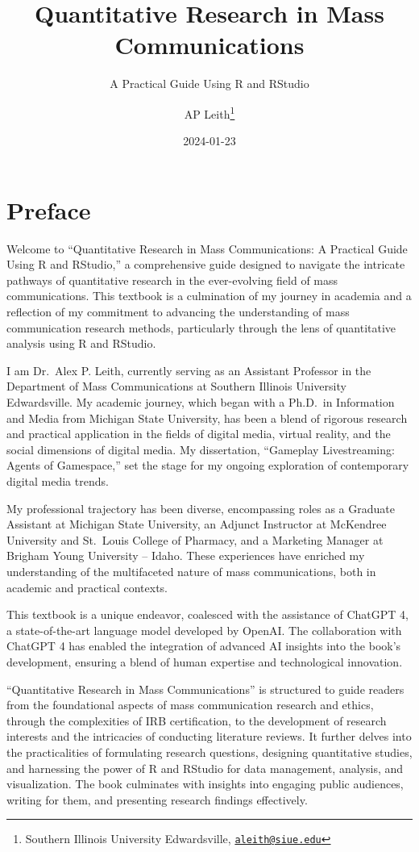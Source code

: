 \documentclass[
]{book}
\title{Quantitative Research in Mass Communications}
\subtitle{A Practical Guide Using R and RStudio}
\author{AP Leith\footnote{Southern Illinois University Edwardsville, \href{mailto:aleith@siue.edu}{\nolinkurl{aleith@siue.edu}}}}
\date{2024-01-23}
\begin{document}
\maketitle

{
\setcounter{tocdepth}{1}
\tableofcontents
}
\hypertarget{preface}{%
\chapter*{Preface}\label{preface}}

Welcome to ``Quantitative Research in Mass Communications: A Practical Guide Using R and RStudio,'' a comprehensive guide designed to navigate the intricate pathways of quantitative research in the ever-evolving field of mass communications. This textbook is a culmination of my journey in academia and a reflection of my commitment to advancing the understanding of mass communication research methods, particularly through the lens of quantitative analysis using R and RStudio.

I am Dr.~Alex P. Leith, currently serving as an Assistant Professor in the Department of Mass Communications at Southern Illinois University Edwardsville. My academic journey, which began with a Ph.D.~in Information and Media from Michigan State University, has been a blend of rigorous research and practical application in the fields of digital media, virtual reality, and the social dimensions of digital media. My dissertation, ``Gameplay Livestreaming: Agents of Gamespace,'' set the stage for my ongoing exploration of contemporary digital media trends.

My professional trajectory has been diverse, encompassing roles as a Graduate Assistant at Michigan State University, an Adjunct Instructor at McKendree University and St.~Louis College of Pharmacy, and a Marketing Manager at Brigham Young University -- Idaho. These experiences have enriched my understanding of the multifaceted nature of mass communications, both in academic and practical contexts.

This textbook is a unique endeavor, coalesced with the assistance of ChatGPT 4, a state-of-the-art language model developed by OpenAI. The collaboration with ChatGPT 4 has enabled the integration of advanced AI insights into the book's development, ensuring a blend of human expertise and technological innovation.

``Quantitative Research in Mass Communications'' is structured to guide readers from the foundational aspects of mass communication research and ethics, through the complexities of IRB certification, to the development of research interests and the intricacies of conducting literature reviews. It further delves into the practicalities of formulating research questions, designing quantitative studies, and harnessing the power of R and RStudio for data management, analysis, and visualization. The book culminates with insights into engaging public audiences, writing for them, and presenting research findings effectively.
\end{document}
